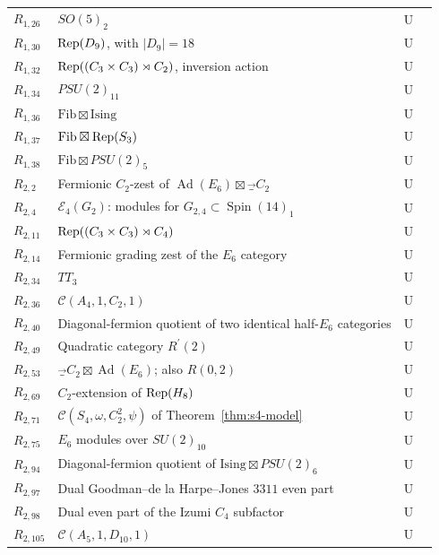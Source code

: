 \begin{longtable}{@{}lp{8.0cm}cl@{}}
$R_{1,26}$ & $SO(5)_2$ & U & \cite{LPR}\\
$R_{1,30}$ & $\operatorname{Rep}(D_9)$, with $|D_9|=18$ & U & \cite{LPR}\\
$R_{1,32}$ & $\operatorname{Rep}((C_3\times C_3)\rtimes C_2)$, inversion action & U & \cite{LPR}\\
$R_{1,34}$ & $PSU(2)_{11}$ & U & \cite{LPR}\\
$R_{1,36}$ & $\mathrm{Fib}\boxtimes\mathrm{Ising}$ & U & \cite{LPR}\\
$R_{1,37}$ & $\mathrm{Fib}\boxtimes\operatorname{Rep}(S_3)$ & U & \cite{LPR}\\
$R_{1,38}$ & $\mathrm{Fib}\boxtimes PSU(2)_5$ & U & \cite{LPR}\\
\addlinespace
$R_{2,2}$ & Fermionic $C_2$-zest of $\operatorname{Ad}(E_6)\boxtimes\Vec_{C_2}$ & U & \cite{DGP}\\
$R_{2,4}$ & $\mathcal E_4(G_2)$: modules for $G_{2,4}\subset\operatorname{Spin}(14)_1$ & U & \cite{CRT}\\
$R_{2,11}$ & $\operatorname{Rep}((C_3\times C_3)\rtimes C_4)$ & U & \cite{EGNO}\\
$R_{2,14}$ & Fermionic grading zest of the $E_6$ category & U & \cite{DGP}\\
$R_{2,34}$ & $TT_3$ & U & \cite{EM}\\
$R_{2,36}$ & $\mathcal C(A_4,1,C_2,1)$ & U & \cite{Integral}\\
$R_{2,40}$ & Diagonal-fermion quotient of two identical half-$E_6$ categories & U & \cite{ALW}\\
$R_{2,49}$ & Quadratic category $R^{\prime}(2)$ & U & \cite{MY}\\
$R_{2,53}$ & $\Vec_{C_2}\boxtimes\operatorname{Ad}(E_6)$; also $R(0,2)$ & U & \cite{MY}\\
$R_{2,69}$ & $C_2$-extension of $\operatorname{Rep}(H_8)$ & U & \cite{CLS}\\
$R_{2,71}$ & $\mathcal C(S_4,\omega,C_2^2,\psi)$ of Theorem~\ref{thm:s4-model} & U & \cite{GNgt}\\
$R_{2,75}$ & $E_6$ modules over $SU(2)_{10}$ & U & \cite{KO}\\
$R_{2,94}$ & Diagonal-fermion quotient of $\mathrm{Ising}\boxtimes PSU(2)_6$ & U & \cite{EGNO}\\
$R_{2,97}$ & Dual Goodman--de la Harpe--Jones $3311$ even part & U & \cite{IJMS}\\
$R_{2,98}$ & Dual even part of the Izumi $C_4$ subfactor & U & \cite{IMP}\\
$R_{2,105}$ & $\mathcal C(A_5,1,D_{10},1)$ & U & \cite{Integral}\\

\end{longtable}
